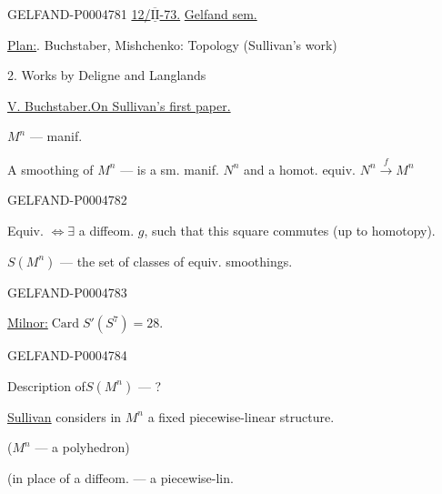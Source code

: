\begin{GelfandAdjacentEvidence}{GELFAND-P000478}{1}
\uline{12/\mbox{$\overline{\underline{\mathrm{II}}}$}-73.}
\qquad\uline{Gelfand sem.}

\uline{Plan:}. Buchstaber, Mishchenko: Topology (Sullivan's work)

\hspace*{3.5em}2. Works by Deligne and Langlands

\uline{V. Buchstaber.}\qquad\uline{On Sullivan's first paper.}

$M^n$ — manif.

A smoothing of $M^n$ — is a sm. manif. $N^n$ and a homot. equiv.
$N^n\xrightarrow{f}M^n$
\end{GelfandAdjacentEvidence}
\begin{GelfandAdjacentEvidence}{GELFAND-P000478}{2}

Equiv. $\Longleftrightarrow\exists$ a diffeom. $g$, such that this square commutes (up to homotopy).

$S(M^n)$ — the set of classes of equiv. smoothings.

\end{GelfandAdjacentEvidence}
\begin{GelfandAdjacentEvidence}{GELFAND-P000478}{3}

\uline{Milnor:}\quad $\operatorname{Card}S'(S^7)=28$.
\end{GelfandAdjacentEvidence}
\begin{GelfandAdjacentEvidence}{GELFAND-P000478}{4}


Description of\quad $S(M^n)$ — ?

\uline{Sullivan} considers in $M^n$ a fixed piecewise-linear structure.
\par\hfill ($M^n$ — a polyhedron)


(in place of a diffeom. — a piecewise-lin.
\end{GelfandAdjacentEvidence}
